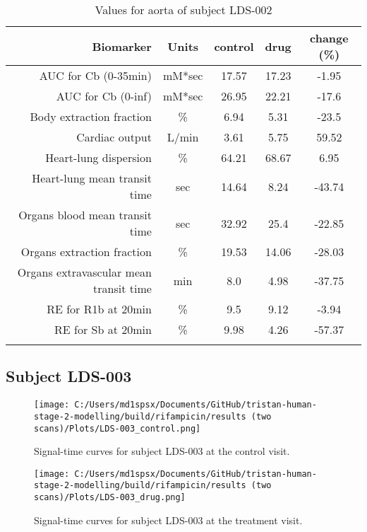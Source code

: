 \documentclass{epflreport}%
\begin{document}
\begin{longtable}{rcccc}%
\hline%
Biomarker&Units&control&drug&change (\%)\\%
\hline%
AUC for Cb (0{-}35min)&mM*sec&17.57&17.23&{-}1.95\\%
AUC for Cb (0{-}inf)&mM*sec&26.95&22.21&{-}17.6\\%
Body extraction fraction&\%&6.94&5.31&{-}23.5\\%
Cardiac output&L/min&3.61&5.75&59.52\\%
Heart{-}lung dispersion&\%&64.21&68.67&6.95\\%
Heart{-}lung mean transit time&sec&14.64&8.24&{-}43.74\\%
Organs blood mean transit time&sec&32.92&25.4&{-}22.85\\%
Organs extraction fraction&\%&19.53&14.06&{-}28.03\\%
Organs extravascular mean transit time&min&8.0&4.98&{-}37.75\\%
RE for R1b at 20min&\%&9.5&9.12&{-}3.94\\%
RE for Sb at 20min&\%&9.98&4.26&{-}57.37\\%
\hline%
\caption{Values for aorta of subject LDS-002} \\%
\end{longtable}%
\clearpage%
\subsection{Subject LDS{-}003}%
\label{subsec:SubjectLDS{-}003}%

%


\begin{figure}[h!]%
\centering%
\texttt{[image: C:/Users/md1spsx/Documents/GitHub/tristan-human-stage-2-modelling/build/rifampicin/results (two scans)/Plots/LDS-003\_control.png]}%
\caption{Signal{-}time curves for subject LDS{-}003 at the control visit.}%
\end{figure}

%


\begin{figure}[h!]%
\centering%
\texttt{[image: C:/Users/md1spsx/Documents/GitHub/tristan-human-stage-2-modelling/build/rifampicin/results (two scans)/Plots/LDS-003\_drug.png]}%
\caption{Signal{-}time curves for subject LDS{-}003 at the treatment visit.}%
\end{figure}
\end{document}
